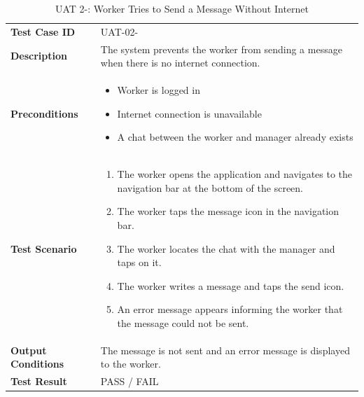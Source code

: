 \documentclass[12pt,a4paper]{article}
\begin{document}
\begin{table}[h]
\centering
\caption{UAT 2-: Worker Tries to Send a Message Without Internet}
\begin{tabularx}{\textwidth}{>{\bfseries}l X}
\toprule
Test Case ID & UAT-02- \\
Description & The system prevents the worker from sending a message when there is no internet connection. \\
Preconditions &
\begin{itemize}[noitemsep]
    \item Worker is logged in
    \item Internet connection is unavailable
    \item A chat between the worker and manager already exists
\end{itemize} \\
Test Scenario &
\begin{enumerate}[noitemsep]
    \item The worker opens the application and navigates to the navigation bar at the bottom of the screen.
    \item The worker taps the message icon in the navigation bar.
    \item The worker locates the chat with the manager and taps on it.
    \item The worker writes a message and taps the send icon.
    \item An error message appears informing the worker that the message could not be sent.
\end{enumerate} \\
Output Conditions & The message is not sent and an error message is displayed to the worker. \\
Test Result & PASS / FAIL \\
\bottomrule
\end{tabularx}
\end{table}
\end{document}
